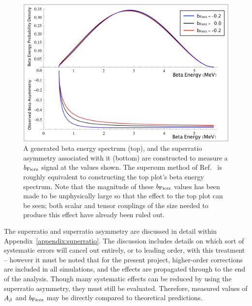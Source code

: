 \begin{figure}[h!!tb]
	\centering
	\includegraphics[width=.999\linewidth]
	{Figures/Fierz_Signature.png}
	\caption[Generated Beta Energy Spectrum and Superratio Asymmetry to Measure $\bFierz$]{A generated beta energy spectrum (top), and the superratio asymmetry associated with it (bottom) are constructed to measure a $\bFierz$ signal at the values shown.  The supersum method of Ref.~\cite{UCNA_first_Fierz} is roughly equivalent to constructing the top plot's beta energy spectrum.  Note that the magnitude of these $\bFierz$ values has been made to be unphysically large so that the effect to the top plot can be seen; both scalar and tensor couplings of the size needed to produce this effect have already been ruled out. }	\label{fig:FierzSignature}
\end{figure}

The superratio and superratio asymmetry are discussed in detail within Appendix~\ref{appendix:superratio}.  The discussion includes details on which sort of systematic errors will cancel out entirely, or to leading order, with this treatment -- however it must be noted that for the present project, higher-order corrections are included in all simulations, and the effects are propagated through to the end of the analysis.  Though many systematic effects can be reduced by using the superratio asymmetry, they must still be evaluated.  Therefore, measured values of $A_{\beta}$ and $\bFierz$ may be directly compared to theoretical predictions.



\note{}


